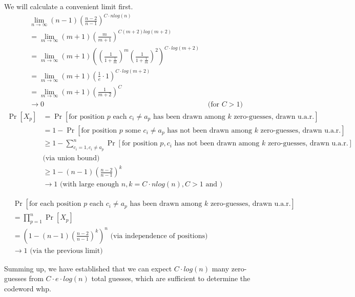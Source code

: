 \documentclass[a4paper,german]{article}
\begin{document}
\begin{enumerate}
We will calculate a convenient limit first.
\begin{align*}
&\lim_{n \to \infty}(n-1) (\frac{n-2}{n-1})^{C \cdot nlog(n)} \\
&= \lim_{m \to \infty}(m+1) (\frac{m}{m+1})^{C (m+2)log(m+2)} \\ 
&=  \lim_{m \to \infty} (m+1)((\frac{1}{1 + \frac{1}{m}})^m(\frac{1}{1 + \frac{1}{m}})^2)^{C \cdot log(m+2)} \\
&= \lim_{m \to \infty} (m+1)(\frac{1}{e} \cdot 1)^{C \cdot log(m+2)} \\
&= \lim_{m \to \infty} (m+1)(\frac{1}{m+2})^C \\
& \to 0   & \text{ (for } C > 1 \text{)}
\end{align*}
\begin{align*}
\Pr[X_p] &= \Pr[\text{for position } p \text{ each } c_i \neq a_p \text{ has been drawn among } k \text{ zero-guesses, drawn u.a.r.}] \\
&= 1 - \Pr[\text{for position } p \text{ some } c_i \neq a_p \text{ has not been drawn among } k \text{ zero-guesses, drawn u.a.r.}] \\
&\geq 1 - \sum_{c_i = 1, c_i \neq a_p}^n \Pr[\text{for position } p,  c_i  \text{ has not been drawn among } k \text{ zero-guesses, drawn u.a.r.}]\\
& \text{(via union bound)} \\
&\geq 1 - (n-1)(\frac{n-2}{n-1})^k \\
&\to 1 \text{ (with large enough } n, k = C \cdot nlog(n), C > 1 \text{ and } \text{)}
\end{align*}

\begin{align*}
&\Pr[\text{for each position } p \text{ each } c_i \neq a_p \text{ has been drawn among } k \text{ zero-guesses, drawn u.a.r.}] \\
&= \prod_{p = 1}^n \Pr[X_p] \\
&= (1 - (n-1)(\frac{n-2}{n-1})^k)^n \text{ (via independence of positions)} \\
&\to 1 \text{ (via the previous limit)}
\end{align*}

Summing up, we have established that we can expect \(C\cdot log(n) \) many zero-guesses from \(C\cdot e \cdot log(n)\) total guesses, which are sufficient to determine the codeword whp.


\end{enumerate}
\end{document}
